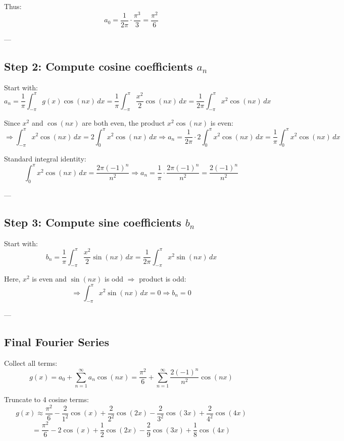 \documentclass{article}
\begin{document}
Thus:
\[
a_0 = \frac{1}{2\pi} \cdot \frac{\pi^3}{3} = \frac{\pi^2}{6}
\]

---

\subsection*{Step 2: Compute cosine coefficients \( a_n \)}

Start with:
\[
a_n = \frac{1}{\pi} \int_{-\pi}^{\pi} g(x) \cos(nx) \, dx = \frac{1}{\pi} \int_{-\pi}^{\pi} \frac{x^2}{2} \cos(nx) \, dx = \frac{1}{2\pi} \int_{-\pi}^{\pi} x^2 \cos(nx) \, dx
\]

Since \( x^2 \) and \( \cos(nx) \) are both even, the product \( x^2 \cos(nx) \) is even:
\[
\Rightarrow \int_{-\pi}^{\pi} x^2 \cos(nx) \, dx = 2 \int_0^{\pi} x^2 \cos(nx) \, dx
\Rightarrow a_n = \frac{1}{2\pi} \cdot 2 \int_0^{\pi} x^2 \cos(nx) \, dx = \frac{1}{\pi} \int_0^{\pi} x^2 \cos(nx) \, dx
\]

Standard integral identity:
\[
\int_0^{\pi} x^2 \cos(nx) \, dx = \frac{2\pi (-1)^n}{n^2}
\Rightarrow a_n = \frac{1}{\pi} \cdot \frac{2\pi (-1)^n}{n^2} = \frac{2(-1)^n}{n^2}
\]

---

\subsection*{Step 3: Compute sine coefficients \( b_n \)}

Start with:
\[
b_n = \frac{1}{\pi} \int_{-\pi}^{\pi} \frac{x^2}{2} \sin(nx) \, dx = \frac{1}{2\pi} \int_{-\pi}^{\pi} x^2 \sin(nx) \, dx
\]

Here, \( x^2 \) is even and \( \sin(nx) \) is odd \( \Rightarrow \) product is odd:
\[
\Rightarrow \int_{-\pi}^{\pi} x^2 \sin(nx) \, dx = 0 \Rightarrow b_n = 0
\]

---

\subsection*{Final Fourier Series}

Collect all terms:
\[
g(x) = a_0 + \sum_{n=1}^{\infty} a_n \cos(nx) = \frac{\pi^2}{6} + \sum_{n=1}^{\infty} \frac{2(-1)^n}{n^2} \cos(nx)
\]

Truncate to 4 cosine terms:
\[
g(x) \approx \frac{\pi^2}{6} - \frac{2}{1^2} \cos(x) + \frac{2}{2^2} \cos(2x) - \frac{2}{3^2} \cos(3x) + \frac{2}{4^2} \cos(4x)
\]
\[
= \frac{\pi^2}{6} - 2 \cos(x) + \frac{1}{2} \cos(2x) - \frac{2}{9} \cos(3x) + \frac{1}{8} \cos(4x)
\]
\end{document}
